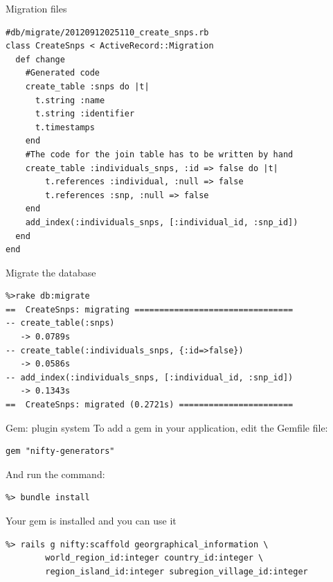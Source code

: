 \documentclass[12pt]{beamer}
\begin{document}
\begin{frame}[fragile]
  \begin{block}{Migration files}
  	\begin{verbatim}
#db/migrate/20120912025110_create_snps.rb
class CreateSnps < ActiveRecord::Migration
  def change
    #Generated code
    create_table :snps do |t|
      t.string :name
      t.string :identifier
      t.timestamps
    end
    #The code for the join table has to be written by hand
    create_table :individuals_snps, :id => false do |t|
  		t.references :individual, :null => false
  		t.references :snp, :null => false
	end
	add_index(:individuals_snps, [:individual_id, :snp_id])
  end
end
	\end{verbatim}
  \end{block}
\end{frame}

\begin{frame}[fragile]
  \begin{block}{Migrate the database}
	\begin{verbatim}
%>rake db:migrate
==  CreateSnps: migrating ================================
-- create_table(:snps)
   -> 0.0789s
-- create_table(:individuals_snps, {:id=>false})
   -> 0.0586s
-- add_index(:individuals_snps, [:individual_id, :snp_id])
   -> 0.1343s
==  CreateSnps: migrated (0.2721s) =======================
	\end{verbatim}
  \end{block}
\end{frame}


\begin{frame}[fragile]
  \begin{block}{Gem: plugin system}
  	To add a gem in your application, edit the Gemfile file:
	\begin{verbatim}
gem "nifty-generators"
	\end{verbatim}
	And run the command:
	\begin{verbatim}
%> bundle install
	\end{verbatim}
	Your gem is installed and you can use it
	\begin{verbatim}
%> rails g nifty:scaffold georgraphical_information \ 
		world_region_id:integer country_id:integer \
		region_island_id:integer subregion_village_id:integer
	\end{verbatim}
  \end{block}
\end{frame}
\end{document}
